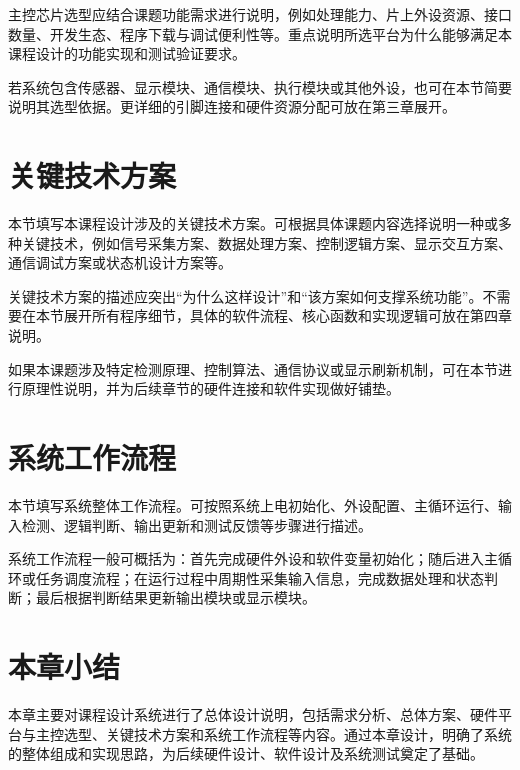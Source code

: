 主控芯片选型应结合课题功能需求进行说明，例如处理能力、片上外设资源、接口数量、开发生态、程序下载与调试便利性等。重点说明所选平台为什么能够满足本课程设计的功能实现和测试验证要求。

若系统包含传感器、显示模块、通信模块、执行模块或其他外设，也可在本节简要说明其选型依据。更详细的引脚连接和硬件资源分配可放在第三章展开。

\section{关键技术方案}

本节填写本课程设计涉及的关键技术方案。可根据具体课题内容选择说明一种或多种关键技术，例如信号采集方案、数据处理方案、控制逻辑方案、显示交互方案、通信调试方案或状态机设计方案等。

关键技术方案的描述应突出“为什么这样设计”和“该方案如何支撑系统功能”。不需要在本节展开所有程序细节，具体的软件流程、核心函数和实现逻辑可放在第四章说明。

如果本课题涉及特定检测原理、控制算法、通信协议或显示刷新机制，可在本节进行原理性说明，并为后续章节的硬件连接和软件实现做好铺垫。

\section{系统工作流程}

本节填写系统整体工作流程。可按照系统上电初始化、外设配置、主循环运行、输入检测、逻辑判断、输出更新和测试反馈等步骤进行描述。

系统工作流程一般可概括为：首先完成硬件外设和软件变量初始化；随后进入主循环或任务调度流程；在运行过程中周期性采集输入信息，完成数据处理和状态判断；最后根据判断结果更新输出模块或显示模块。


\section{本章小结}

本章主要对课程设计系统进行了总体设计说明，包括需求分析、总体方案、硬件平台与主控选型、关键技术方案和系统工作流程等内容。通过本章设计，明确了系统的整体组成和实现思路，为后续硬件设计、软件设计及系统测试奠定了基础。
